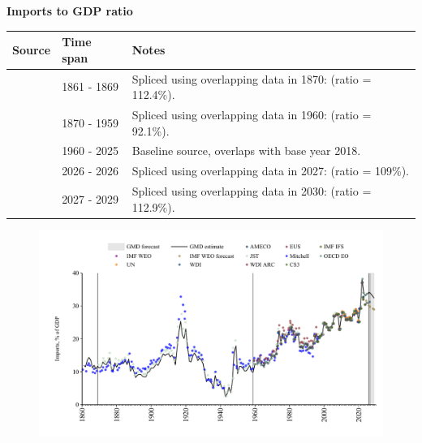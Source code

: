 \documentclass[12pt,a4paper,landscape]{article}
\begin{document}
\begin{adjustbox}{max totalsize={\paperwidth}{\paperheight},center}
\begin{minipage}[t][\textheight][t]{\textwidth}
\vspace*{0.5cm}
{}
\begin{center}
{\Large\bfseries Imports to GDP ratio}
\end{center}
\vspace{0.5cm}
\begin{table}[H]
\centering
\small
\begin{tabular}{|l|l|l|}
\hline
\textbf{Source} & \textbf{Time span} & \textbf{Notes} \\
\hline
\rowcolor{white}\cite{Mitchell}& 1861 - 1869 &Spliced using overlapping data in 1870: (ratio = 112.4\%). \\
\rowcolor{lightgray}\cite{JST}& 1870 - 1959 &Spliced using overlapping data in 1960: (ratio = 92.1\%). \\
\rowcolor{white}\cite{OECD_EO}& 1960 - 2025 &Baseline source, overlaps with base year 2018. \\
\rowcolor{lightgray}\cite{AMECO}& 2026 - 2026 &Spliced using overlapping data in 2027: (ratio = 109\%). \\
\rowcolor{white}\cite{IMF_WEO_forecast}& 2027 - 2029 &Spliced using overlapping data in 2030: (ratio = 112.9\%). \\
\hline
\end{tabular}
\end{table}
\begin{figure}[H]
\centering
\includegraphics[width=\textwidth,height=0.6\textheight,keepaspectratio]{graphs/ITA_imports_GDP.pdf}
\end{figure}
\end{minipage}
\end{adjustbox}
\end{document}
